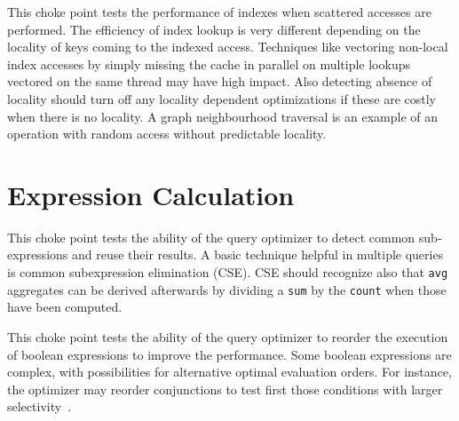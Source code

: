 This choke point tests the performance of indexes when scattered accesses are performed. The efficiency of index lookup is very different depending on the locality of keys coming to the indexed access.
Techniques like vectoring non-local index accesses by simply missing the cache in parallel on multiple lookups vectored on the same thread may have high impact.
Also detecting absence of locality should turn off any locality dependent optimizations if these are costly when there is no locality. A graph neighbourhood traversal is an example of an operation with random access without predictable locality.




\section{Expression Calculation}



This choke point tests the ability of the query optimizer to detect common sub-expressions and reuse their results. A basic technique helpful in multiple queries is common subexpression elimination (CSE).
CSE should recognize also that \lstinline{avg} aggregates can be derived afterwards by dividing a \lstinline{sum} by the \lstinline{count} when those have been computed.





This choke point tests the ability of the query optimizer to reorder the execution of boolean expressions to improve the performance. Some boolean expressions are complex, with possibilities for alternative optimal evaluation orders.
For instance, the optimizer may reorder conjunctions to test first those conditions with larger selectivity~\cite{DBLP:conf/vldb/Moerkotte98}.



